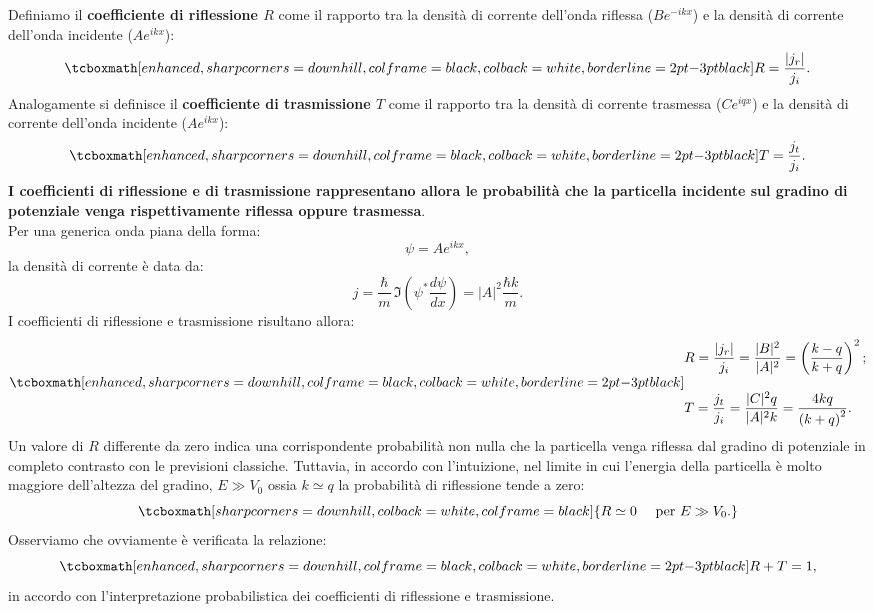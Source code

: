 \documentclass[a4paper,12pt,oneside]{book}
\begin{document}
Definiamo il \textbf{coefficiente di riflessione $R$} come il rapporto tra la densità di corrente dell'onda riflessa ($\displaystyle{Be^{-ikx}}$) e la densità di corrente dell'onda incidente ($\displaystyle{Ae^{ikx}}$):
	\begin{equation}
		\tcboxmath[enhanced, sharp corners=downhill, colframe=black, colback=white, borderline={2pt}{-3pt}{black}]{
			R=\frac{|j_r|}{j_i}.
			}
	\end{equation}
Analogamente si definisce il \textbf{coefficiente di trasmissione $T$} come il rapporto tra la densità di corrente trasmessa ($\displaystyle{Ce^{iqx}}$) e la densità di corrente dell'onda incidente ($\displaystyle{Ae^{ikx}}$):
	\begin{equation}
		\tcboxmath[enhanced, sharp corners=downhill, colframe=black, colback=white, borderline={2pt}{-3pt}{black}]{
			T=\frac{j_t}{j_i}.
			}
	\end{equation}
\textbf{I coefficienti di riflessione e di trasmissione rappresentano allora le probabilità che la particella incidente sul gradino di potenziale venga rispettivamente riflessa oppure trasmessa}.\\
Per una generica onda piana della forma:
	\begin{equation}
		\psi= Ae^{ikx},
	\end{equation}
la densità di corrente è data da:
	\begin{equation}
		j=\frac{\hbar}{m}\, \Im \left(\psi ^* \frac{d\psi}{dx} \right)= |A|^2\frac{\hbar k}{m}.
	\end{equation}
I coefficienti di riflessione e trasmissione risultano allora:
	\begin{equation}
		\tcboxmath[enhanced, sharp corners=downhill, colframe=black, colback=white, borderline={2pt}{-3pt}{black}]{
			\begin{aligned}
			& R=\frac{|j_r|}{j_i}= \frac{|B|^2}{|A|^2}=\left(\frac{k-q}{k+q}\right)^2; \\[0.3cm]
			& T=\frac{j_t}{j_i}= \frac{|C|^2 q}{|A|^2 k}=\frac{4kq}{\left(k+q\right)^2}. 
			\end{aligned}
			}
	\end{equation}
Un valore di $R$ differente da zero indica una corrispondente probabilità non nulla che la particella venga riflessa dal gradino di potenziale in completo contrasto con le previsioni classiche. Tuttavia, in accordo con l'intuizione, nel limite in cui l'energia della particella è molto maggiore dell'altezza del gradino, $E\gg V_0$ ossia $k\simeq q$ la probabilità di riflessione tende a zero:
	\begin{equation}
		\tcboxmath[sharp corners=downhill, colback=white, colframe=black]{
			R\simeq 0\quad  \textrm{ per } E\gg V_0.
			}
	\end{equation}
Osserviamo che ovviamente è verificata la relazione:
	\begin{equation}
		\tcboxmath[enhanced, sharp corners=downhill, colframe=black, colback=white, borderline={2pt}{-3pt}{black}]{
			R+T=1,
			}
	\label{eq:cap10_5}
	\end{equation}
in accordo con l'interpretazione probabilistica dei coefficienti di riflessione e trasmissione.\\
\end{document}
